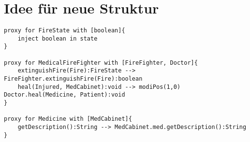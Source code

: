 \documentclass[a4paper,12pt]{article}
\begin{document}
\section{Idee für neue Struktur}
\begin{lstlisting}[style = dsl]
proxy for FireState with [boolean]{
	inject boolean in state
}

proxy for MedicalFireFighter with [FireFighter, Doctor]{
	extinguishFire(Fire):FireState --> FireFighter.extinguishFire(Fire):boolean
	heal(Injured, MedCabinet):void --> modiPos(1,0) Doctor.heal(Medicine, Patient):void 
}

proxy for Medicine with [MedCabinet]{
	getDescription():String --> MedCabinet.med.getDescription():String 
}

\end{lstlisting}
\end{document}
